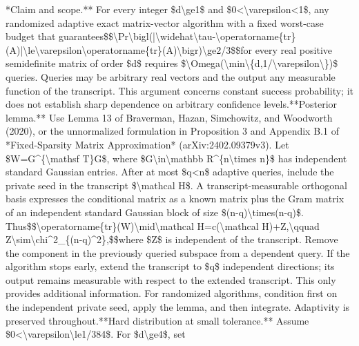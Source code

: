 \documentclass[10pt,a4paper]{article}
\begin{document}
\begingroup\raggedright\sloppy **Claim and scope.** For every integer \$d\textbackslash{}ge1\$ and \$0<\textbackslash{}varepsilon<1\$,\allowbreak{} any randomized adaptive exact matrix-vector algorithm with a fixed worst-case budget that guarantees\newline{}\$\$\textbackslash{}Pr\textbackslash{}bigl(|\textbackslash{}widehat\textbackslash{}tau-\textbackslash{}operatorname\{tr\}(A)|\textbackslash{}le\textbackslash{}varepsilon\textbackslash{}operatorname\{tr\}(A)\textbackslash{}bigr)\textbackslash{}ge2/\allowbreak{}3\$\$\newline{}for every real positive semidefinite matrix of order \$d\$ requires \$\textbackslash{}Omega(\textbackslash{}min\textbackslash{}\{d,\allowbreak{}1/\allowbreak{}\textbackslash{}varepsilon\textbackslash{}\})\$ queries. Queries may be arbitrary real vectors and the output any measurable function of the transcript. This argument concerns constant success probability;\allowbreak{} it does not establish sharp dependence on arbitrary confidence levels.\newline{}\newline{}**Posterior lemma.** Use Lemma 13 of Braverman,\allowbreak{} Hazan,\allowbreak{} Simchowitz,\allowbreak{} and Woodworth (2020),\allowbreak{} or the unnormalized formulation in Proposition 3 and Appendix B.1 of *Fixed-Sparsity Matrix Approximation* (arXiv:\allowbreak{}2402.09379v3). Let \$W=\allowbreak{}G\textasciicircum{}\{\textbackslash{}mathsf T\}G\$,\allowbreak{} where \$G\textbackslash{}in\textbackslash{}mathbb R\textasciicircum{}\{n\textbackslash{}times n\}\$ has independent standard Gaussian entries. After at most \$q<n\$ adaptive queries,\allowbreak{} include the private seed in the transcript \$\textbackslash{}mathcal H\$. A transcript-measurable orthogonal basis expresses the conditional matrix as a known matrix plus the Gram matrix of an independent standard Gaussian block of size \$(n-q)\textbackslash{}times(n-q)\$. Thus\newline{}\$\$\textbackslash{}operatorname\{tr\}(W)\textbackslash{}mid\textbackslash{}mathcal H=\allowbreak{}c(\textbackslash{}mathcal H)+Z,\allowbreak{}\textbackslash{}qquad Z\textbackslash{}sim\textbackslash{}chi\textasciicircum{}2\_\allowbreak{}\{(n-q)\textasciicircum{}2\},\allowbreak{}\$\$\newline{}where \$Z\$ is independent of the transcript. Remove the component in the previously queried subspace from a dependent query. If the algorithm stops early,\allowbreak{} extend the transcript to \$q\$ independent directions;\allowbreak{} its output remains measurable with respect to the extended transcript. This only provides additional information. For randomized algorithms,\allowbreak{} condition first on the independent private seed,\allowbreak{} apply the lemma,\allowbreak{} and then integrate. Adaptivity is preserved throughout.\newline{}\newline{}**Hard distribution at small tolerance.** Assume \$0<\textbackslash{}varepsilon\textbackslash{}le1/\allowbreak{}384\$. For \$d\textbackslash{}ge4\$,\allowbreak{} set 
\end{document}
